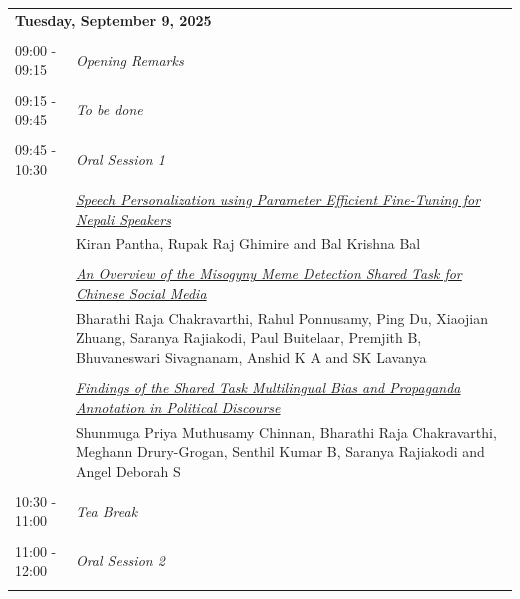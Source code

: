 \documentclass[11pt,oneside]{book}
\begin{document}
    \begin{tabular}{p{24mm}p{124mm}}
    \multicolumn{2}{l}{\bf Tuesday, September 9, 2025 } \\\\
                  09:00 - 09:15 & \emph{Opening Remarks}\\\\
      
                        09:15 - 09:45 & \emph{To be done}\\\\
      
                        09:45 - 10:30 & \emph{Oral Session 1}\\\\
      
                
                      & \hyperlink{page.189}{\emph{Speech Personalization using Parameter Efficient Fine-Tuning for Nepali Speakers}}\\
        & Kiran Pantha\index{Pantha}, Rupak Raj Ghimire\index{Ghimire} and Bal Krishna Bal\index{Bal}\\\\
                
                      & \hyperlink{page.199}{\emph{An Overview of the Misogyny Meme Detection Shared Task for Chinese Social Media}}\\
        & Bharathi Raja Chakravarthi\index{Chakravarthi}, Rahul Ponnusamy\index{Ponnusamy}, Ping Du\index{Du}, Xiaojian Zhuang\index{Zhuang}, Saranya Rajiakodi\index{Rajiakodi}, Paul Buitelaar\index{Buitelaar}, Premjith B\index{B}, Bhuvaneswari Sivagnanam\index{Sivagnanam}, Anshid K A\index{A} and SK Lavanya\index{Lavanya}\\\\
                
                      & \hyperlink{page.208}{\emph{Findings of the Shared Task Multilingual Bias and Propaganda Annotation in Political Discourse}}\\
        & Shunmuga Priya Muthusamy Chinnan\index{Chinnan}, Bharathi Raja Chakravarthi\index{Chakravarthi}, Meghann Drury-Grogan\index{Drury-Grogan}, Senthil Kumar B\index{B}, Saranya Rajiakodi\index{Rajiakodi} and Angel Deborah S\index{S}\\\\
                        10:30 - 11:00 & \emph{Tea Break}\\\\
      
                        11:00 - 12:00 & \emph{Oral Session 2}\\\\
      

\end{tabular}
\end{document}
